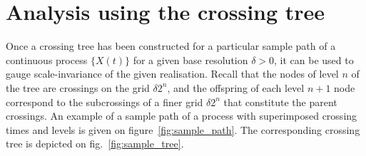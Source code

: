 
\section{Analysis using the crossing tree} %
\label{sec:analysis_using_the_crossing_tree}

Once a crossing tree has been constructed for a particular sample path of a continuous
process $\{X(t)\}$ for a given base resolution $\delta>0$, it can be used to gauge
scale-invariance of the given realisation. Recall that the nodes of level $n$ of
the tree are crossings on the grid $\delta 2^n$, and the offspring of each level
$n+1$ node correspond to the subcrossings of a finer grid $\delta 2^n$ that constitute
the parent crossings. An example of a sample path of a process with superimposed
crossing times and levels is given on figure~\ref{fig:sample_path}. The corresponding
crossing tree is depicted on fig.~\ref{fig:sample_tree}.

